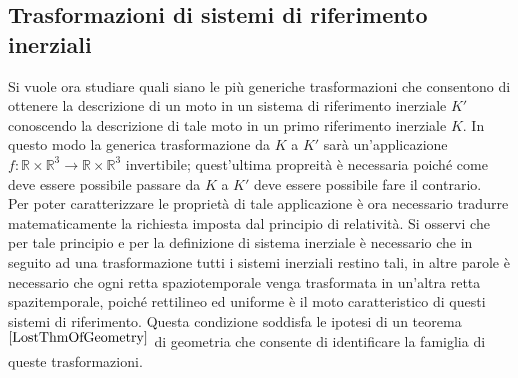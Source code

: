 \subsection{Trasformazioni di sistemi di riferimento inerziali}
Si vuole ora studiare quali siano le più generiche trasformazioni che consentono di ottenere la descrizione di un moto in un sistema di riferimento inerziale $K'$ conoscendo la descrizione di tale moto in un primo riferimento inerziale $K$. In questo modo la generica trasformazione da $K$ a $K'$ sarà un'applicazione $f:\mathbb{R}\times \mathbb{R}^3\rightarrow\mathbb{R}\times \mathbb{R}^3$ invertibile; quest'ultima propreità è necessaria poiché come deve essere possibile passare da $K$ a $K'$ deve essere possibile fare il contrario.\\
Per poter caratterizzare le proprietà di tale applicazione è ora necessario tradurre matematicamente la richiesta imposta dal principio di relatività. Si osservi che per tale principio e per la definizione di sistema inerziale è necessario che in seguito ad una trasformazione tutti i sistemi inerziali restino tali, in altre parole è necessario che ogni retta spaziotemporale venga trasformata in un'altra retta spazitemporale, poiché rettilineo ed uniforme è il moto caratteristico di questi sistemi di riferimento. Questa condizione soddisfa le ipotesi di un teorema$^{\cite{LostThmOfGeometry}}$ di geometria che consente di identificare la famiglia di queste trasformazioni.

